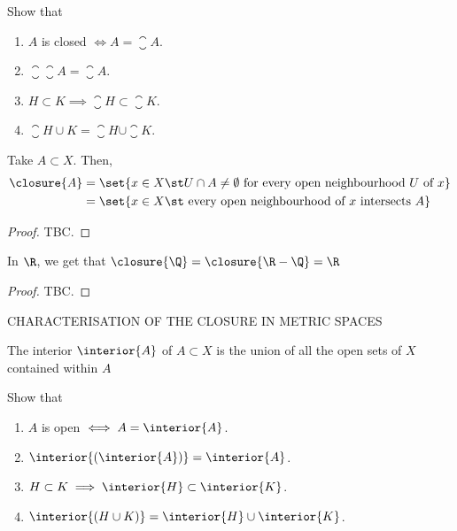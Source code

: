 \begin{exercise}
Show that
\begin{enumerate}
\item $A$ is closed $\iff A = \closure{A}$.
\item $\closure{\closure{A}} = \closure{A}$.
\item $H \subset K \implies \closure{H} \subset \closure{K}$.
\item $\closure{H \cup K} = \closure{H} \cup \closure{K}$.
\end{enumerate}
\end{exercise}

\begin{nlemma}
  Take $A \subset X$. Then,
  \begin{align*}
    \closure{A} &= \set{x \in X \st U \cap A \neq \emptyset \text{ for every open neighbourhood } U \text{ of } x}\\
    &= \set{x \in X \st \text{ every open neighbourhood of } x \text{ intersects } A}\\
  \end{align*}
\end{nlemma}
\begin{proof}
  TBC.
\end{proof}

\begin{ncor}
  In $\R$, we get that $\closure{\Q} = \closure{\R-\Q} = \R$
\end{ncor}
\begin{proof}
  TBC.
\end{proof}

CHARACTERISATION OF THE CLOSURE IN METRIC SPACES

\begin{ndfn}[Interior]
  The interior $\interior{A}$ of $A \subset X$ is the union of all the open sets of $X$ contained within $A$
\end{ndfn}

\begin{exercise}
Show that
\begin{enumerate}
\item $A$ is open $\iff A = \interior{A}$.
\item $\interior{(\interior{A})} = \interior{A}$.
\item $H \subset K \implies \interior{H} \subset \interior{K}$.
\item $\interior{(H \cup K)} = \interior{H} \cup \interior{K}$.
\end{enumerate}
\end{exercise}

